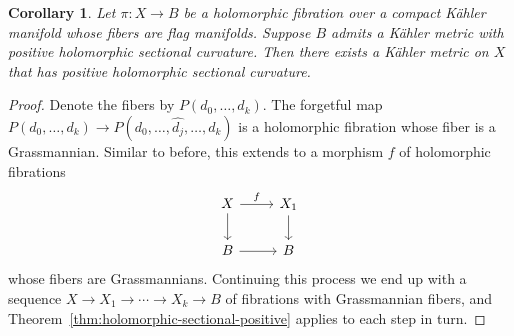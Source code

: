 \documentclass[10pt,a4paper]{amsart}
\newtheorem{coro}[theo]{Corollary}
\theoremstyle{definition}
\def\kahler{K\"ahler}
\begin{document}
\begin{coro}
Let $\pi : X \to B$ be a holomorphic fibration over a compact \kahler{} manifold whose fibers are flag manifolds.
Suppose $B$ admits a \kahler{} metric with positive holomorphic sectional curvature.
Then there exists a \kahler{} metric on $X$ that has positive holomorphic sectional curvature.
\end{coro}

\begin{proof}
Denote the fibers by $P(d_{0}, \ldots, d_{k})$.
The forgetful map $P(d_{0}, \ldots, d_{k}) \to P(d_{0}, \ldots, \hat{d_{j}}, \ldots, d_{k})$ is a holomorphic fibration whose fiber is a Grassmannian.
Similar to before, this extends to a morphism $f$ of holomorphic fibrations
\[
\begin{tikzcd}
  X \ar[r,"f"]\ar[d] & X_{1} \ar[d]
  \\
  B \ar[r] & B
\end{tikzcd}
\]
whose fibers are Grassmannians.
Continuing this process we end up with a sequence $X \to X_{1} \to \cdots \to X_{k} \to B$ of fibrations with Grassmannian fibers, and Theorem~\ref{thm:holomorphic-sectional-positive} applies to each step in turn.
\end{proof}











\end{document}
